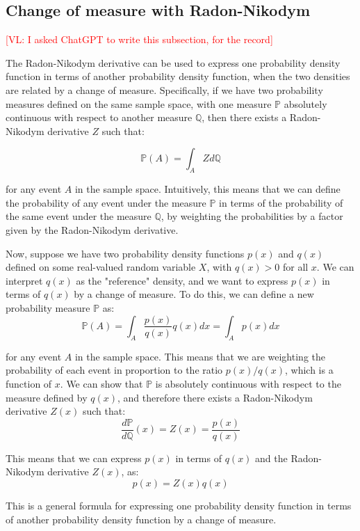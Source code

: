 \documentclass{article}
\newcommand{\vl}[1]{\textcolor{red}{[VL: #1]}}
\begin{document}
\subsection{Change of measure with Radon-Nikodym}
\label{sec:change_of_measure}

\vl{I asked ChatGPT to write this subsection, for the record}

The Radon-Nikodym derivative can be used to express one probability density function in terms of another probability density function, when the two densities are related by a change of measure. Specifically, if we have two probability measures defined on the same sample space, with one measure $\mathbb{P}$ absolutely continuous with respect to another measure $\mathbb{Q}$, then there exists a Radon-Nikodym derivative $Z$ such that:

$$\mathbb{P}(A) = \int_A Z d\mathbb{Q}$$

for any event $A$ in the sample space. Intuitively, this means that we can define the probability of any event under the measure $\mathbb{P}$ in terms of the probability of the same event under the measure $\mathbb{Q}$, by weighting the probabilities by a factor given by the Radon-Nikodym derivative.

Now, suppose we have two probability density functions $p(x)$ and $q(x)$ defined on some real-valued random variable $X$, with $q(x)>0$ for all $x$. We can interpret $q(x)$ as the "reference" density, and we want to express $p(x)$ in terms of $q(x)$ by a change of measure. To do this, we can define a new probability measure $\mathbb{P}$ as:
$$\mathbb{P}(A) = \int_A \frac{p(x)}{q(x)} q(x) dx = \int_A p(x) dx$$

for any event $A$ in the sample space. This means that we are weighting the probability of each event in proportion to the ratio $p(x)/q(x)$, which is a function of $x$. We can show that $\mathbb{P}$ is absolutely continuous with respect to the measure defined by $q(x)$, and therefore there exists a Radon-Nikodym derivative $Z(x)$ such that:
$$\frac{d\mathbb{P}}{d\mathbb{Q}}(x) = Z(x) = \frac{p(x)}{q(x)}$$

This means that we can express $p(x)$ in terms of $q(x)$ and the Radon-Nikodym derivative $Z(x)$, as:
$$p(x) = Z(x) q(x)$$

This is a general formula for expressing one probability density function in terms of another probability density function by a change of measure.

\end{document}
